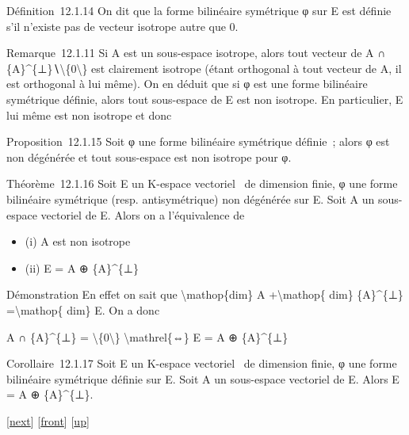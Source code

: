 \documentclass[]{article}
\begin{document}
Définition~12.1.14 On dit que la forme bilinéaire symétrique φ sur E est
définie s'il n'existe pas de vecteur isotrope autre que 0.

Remarque~12.1.11 Si A est un sous-espace isotrope, alors tout vecteur de
A ∩ \{A\}\^{}\{⊥\}∖\textbackslash{}\{0\textbackslash{}\} est clairement
isotrope (étant orthogonal à tout vecteur de A, il est orthogonal à lui
même). On en déduit que si φ est une forme bilinéaire symétrique
définie, alors tout sous-espace de E est non isotrope. En particulier, E
lui même est non isotrope et donc

Proposition~12.1.15 Soit φ une forme bilinéaire symétrique définie~;
alors φ est non dégénérée et tout sous-espace est non isotrope pour φ.

Théorème~12.1.16 Soit E un K-espace vectoriel ~de dimension finie, φ une
forme bilinéaire symétrique (resp. antisymétrique) non dégénérée sur E.
Soit A un sous-espace vectoriel de E. Alors on a l'équivalence de

\begin{itemize}
\itemsep1pt\parskip0pt
\item
  (i) A est non isotrope
\item
  (ii) E = A ⊕ \{A\}\^{}\{⊥\}
\end{itemize}

Démonstration En effet on sait que \textbackslash{}mathop\{dim\} A
+\textbackslash{}mathop\{ dim\} \{A\}\^{}\{⊥\} =\textbackslash{}mathop\{
dim\} E. On a donc

A ∩ \{A\}\^{}\{⊥\} = \textbackslash{}\{0\textbackslash{}\}
\textbackslash{}mathrel\{⇔\} E = A ⊕ \{A\}\^{}\{⊥\}

Corollaire~12.1.17 Soit E un K-espace vectoriel ~de dimension finie, φ
une forme bilinéaire symétrique définie sur E. Soit A un sous-espace
vectoriel de E. Alors E = A ⊕ \{A\}\^{}\{⊥\}.

{[}\href{coursse68.html}{next}{]} {[}\href{coursse67.html}{front}{]}
{[}\href{coursch13.html\#coursse67.html}{up}{]}
\end{document}
